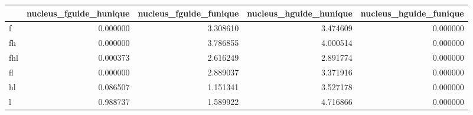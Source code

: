 \begin{tabular}{lrrrr}
\toprule
 & nucleus_fguide_hunique & nucleus_fguide_funique & nucleus_hguide_hunique & nucleus_hguide_funique \\
\midrule
f & 0.000000 & 3.308610 & 3.474609 & 0.000000 \\
fh & 0.000000 & 3.786855 & 4.000514 & 0.000000 \\
fhl & 0.000373 & 2.616249 & 2.891774 & 0.000000 \\
fl & 0.000000 & 2.889037 & 3.371916 & 0.000000 \\
hl & 0.086507 & 1.151341 & 3.527178 & 0.000000 \\
l & 0.988737 & 1.589922 & 4.716866 & 0.000000 \\
\bottomrule
\end{tabular}
